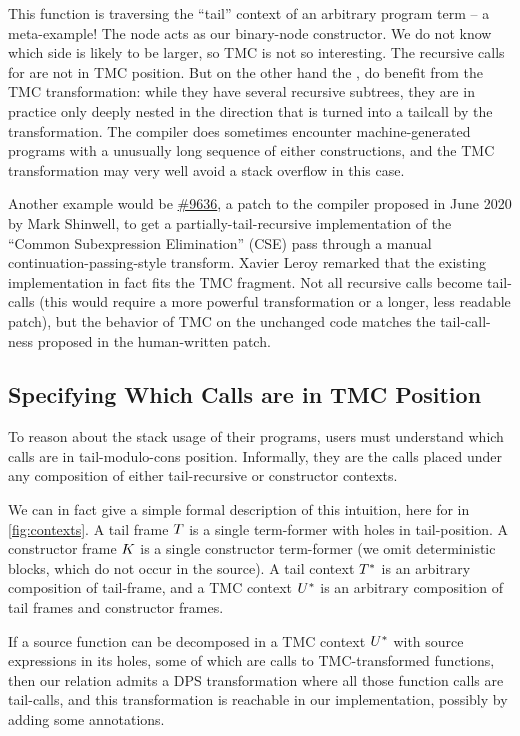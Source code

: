 This function is traversing the ``tail'' context of an arbitrary program term -- a meta-example!
The  node acts as our binary-node constructor.
We do not know which side is likely to be larger, so TMC is not so interesting.
The recursive calls for  are not in TMC position.
But on the other hand the ,  do benefit from the TMC transformation: while they have several recursive subtrees, they are in practice only deeply nested in the direction that is turned into a tailcall by the transformation.
The \OCaml compiler does sometimes encounter machine-generated programs with a unusually long sequence of either constructions, and the TMC transformation may very well avoid a stack overflow in this case.

Another example would be \href{https://github.com/ocaml/ocaml/pull/9636}{\#9636}, a patch to the \OCaml compiler proposed in June 2020 by Mark Shinwell, to get a partially-tail-recursive implementation of the ``Common Subexpression Elimination'' (CSE) pass through a manual continuation-passing-style transform.
Xavier Leroy remarked that the existing implementation in fact fits the TMC fragment. Not all recursive calls become tail-calls (this would require a more powerful transformation or a longer, less readable patch), but the behavior of TMC on the unchanged code matches the tail-call-ness proposed in the human-written patch.

\subsection{Specifying Which Calls are in TMC Position} \label{subsec:specification}
To reason about the stack usage of their programs, users must understand which calls are in tail-modulo-cons position.
Informally, they are the calls placed under any composition of either tail-recursive or constructor contexts.

We can in fact give a simple formal description of this intuition, here for \DataLang in \cref{fig:contexts}.
A tail frame $\datalangTailFrame$ is a single term-former with holes in tail-position.
A constructor frame $\datalangConsFrame$ is a single constructor term-former (we omit deterministic blocks, which do not occur in the source).
A tail context $\datalangTailCtx$ is an arbitrary composition of tail-frame, and a TMC context $\datalangTMCCtx$ is an arbitrary composition of tail frames and constructor frames.

If a source function can be decomposed in a TMC context $\datalangTMCCtx$ with source expressions in its holes, some of which are calls to TMC-transformed functions, then our relation admits a DPS transformation where all those function calls are tail-calls, and this transformation is reachable in our \OCaml implementation, possibly by adding some annotations.

